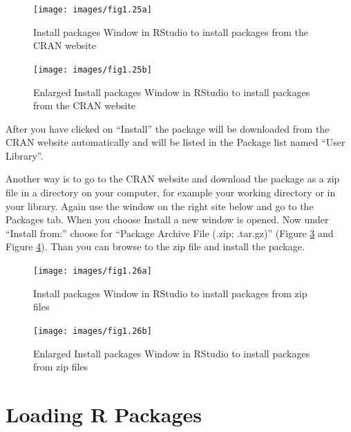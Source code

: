 \documentclass[
]{book}
\begin{document}
\begin{figure}

{\centering \texttt{[image: images/fig1.25a]} 

}

\caption{Install packages Window in RStudio to install packages from the CRAN website}\label{fig:fig25}
\end{figure}

\begin{figure}

{\centering \texttt{[image: images/fig1.25b]} 

}

\caption{Enlarged Install packages Window in RStudio to install packages from the CRAN website}\label{fig:fig26}
\end{figure}

After you have clicked on ``Install'' the package will be downloaded from the CRAN website automatically and will be listed in the Package list named ``User Library''.

Another way is to go to the CRAN website and download the package as a zip file in a directory on your computer, for example your working directory or in your library. Again use the window on the right site below and go to the Packages tab. When you choose Install a new window is opened. Now under ``Install from:'' choose for ``Package Archive File (.zip; .tar.gz)'' (Figure \ref{fig:fig27} and Figure \ref{fig:fig28}). Than you can browse to the zip file and install the package.

\begin{figure}

{\centering \texttt{[image: images/fig1.26a]} 

}

\caption{Install packages Window in RStudio to install packages from zip files}\label{fig:fig27}
\end{figure}

\begin{figure}

{\centering \texttt{[image: images/fig1.26b]} 

}

\caption{Enlarged Install packages Window in RStudio to install packages from zip files}\label{fig:fig28}
\end{figure}

\hypertarget{loading-r-packages}{%
\section{Loading R Packages}\label{loading-r-packages}}
\end{document}
